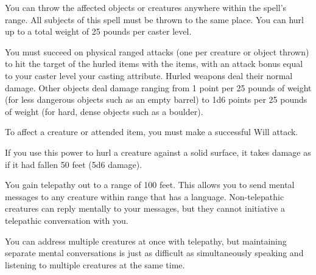 \begin{spelleffect}
    You can throw the affected objects or creatures anywhere within the spell's range. All subjects of this spell must be thrown to the same place. You can hurl up to a total weight of 25 pounds per caster level.
    \par You must succeed on physical ranged attacks (one per creature or object thrown) to hit the target of the hurled items with the items, with an attack bonus equal to your caster level \add your casting attribute. Hurled weapons deal their normal damage. Other objects deal damage ranging from 1 point per 25 pounds of weight (for less dangerous objects such as an empty barrel) to 1d6 points per 25 pounds of weight (for hard, dense objects such as a boulder).
    \par To affect a creature or attended item, you must make a successful Will attack.
    \par If you use this power to hurl a creature against a solid surface, it takes damage as if it had fallen 50 feet (5d6 damage).
\end{spelleffect}

\spelldur{\durlong}
\begin{spelleffect}
    You gain telepathy out to a range of 100 feet. This allows you to send mental messages to any creature within range that has a language. Non-telepathic creatures can reply mentally to your messages, but they cannot initiative a telepathic conversation with you.

    You can address multiple creatures at once with telepathy, but maintaining separate mental conversations is just as difficult as simultaneously speaking and listening to multiple creatures at the same time. 
\end{spelleffect}

